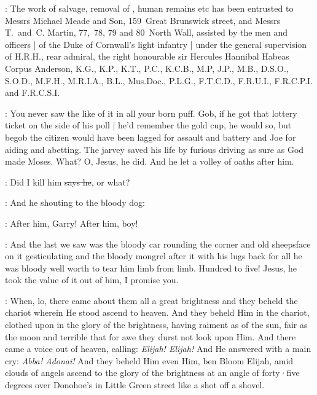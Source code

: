 :
The work of salvage,
removal of ,
human remains etc has been entrusted to Messrs Michael Meade and Son,
159~Great Brunswick street,
and Messrs T.~and~C. Martin,
77,~78, 79 and 80~North Wall,
assisted by the men and officers |
of the Duke of Cornwall's light infantry |
under the general supervision of H.R.H.,
rear admiral,
the right honourable sir Hercules Hannibal Habeas Corpus Anderson,
K.G.,
K.P.,
K.T.,
P.C.,
K.C.B.,
M.P,
J.P.,
M.B.,
D.S.O.,
S.O.D.,
M.F.H.,
M.R.I.A.,
B.L.,
Mus.Doc.,
P.L.G.,
F.T.C.D.,
F.R.U.I.,
F.R.C.P.I.
and F.R.C.S.I.

\Nq:
You never saw the like of it in all your born puff.
Gob,
if he got that lottery ticket on the side of his poll |
he'd remember the gold cup,
he would so,
but begob the citizen would have been lagged for assault
and battery and Joe for aiding and abetting.
The jarvey saved his life
by furious driving as sure as God made Moses.
What?
O, Jesus,
he did.
And he let a volley of oaths after him.

\citizen:
Did I kill him
\sout{says he},
or what?

\Nq:
And he shouting to the bloody dog:

\citizen:
After him,
Garry!
After him,
boy!

\Nq:
And the last we saw was the bloody car rounding the corner and old
sheepsface on it gesticulating and the bloody mongrel after it with his
lugs back for all he was bloody well worth to tear him limb from limb.
Hundred to five!
Jesus,
he took the value of it out of him,
I promise you.

:
When,
lo,
there came about them all a great brightness and they
beheld the chariot wherein He stood ascend to heaven.
And they beheld
Him in the chariot,
clothed upon in the glory of the brightness,
having raiment as of the sun,
fair as the moon and terrible that for awe they
durst not look upon Him.
And there came a voice out of heaven,
calling:
\emph{Elijah!
Elijah!}
And He answered with a main cry:
\emph{Abba!
Adonai!}
And they beheld Him even Him,
ben Bloom Elijah,
amid clouds of angels ascend
to the glory of the brightness at an angle of forty·five degrees over
Donohoe's in Little Green street like a shot off a shovel.
